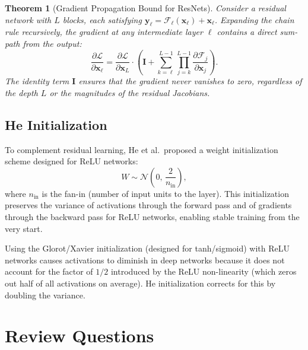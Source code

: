 \documentclass[12pt,a4paper]{article}
\newtheorem{theorem}{Theorem}[section]
\begin{document}
\begin{theorem}[Gradient Propagation Bound for ResNets]
\label{thm:resnet_grad}
Consider a residual network with $L$ blocks, each satisfying $\mathbf{y}_\ell = \mathcal{F}_\ell(\mathbf{x}_\ell) + \mathbf{x}_\ell$. Expanding the chain rule recursively, the gradient at any intermediate layer $\ell$ contains a direct sum-path from the output:
\begin{equation}
  \frac{\partial \mathcal{L}}{\partial \mathbf{x}_\ell}
  = \frac{\partial \mathcal{L}}{\partial \mathbf{x}_L}
    \cdot \left(\mathbf{I} + \sum_{k=\ell}^{L-1} \prod_{j=k}^{L-1}
      \frac{\partial \mathcal{F}_j}{\partial \mathbf{x}_j}\right).
  \label{eq:resnet_grad_bound}
\end{equation}
The identity term $\mathbf{I}$ ensures that the gradient never vanishes to zero, regardless of the depth $L$ or the magnitudes of the residual Jacobians.
\end{theorem}

\subsection{He Initialization}

To complement residual learning, He et al.\ proposed a weight initialization scheme designed for ReLU networks:
\begin{equation}
  W \sim \mathcal{N}\!\left(0,\, \frac{2}{n_{\text{in}}}\right),
  \label{eq:he_init}
\end{equation}
where $n_{\text{in}}$ is the fan-in (number of input units to the layer). This initialization preserves the variance of activations through the forward pass and of gradients through the backward pass for ReLU networks, enabling stable training from the very start.

\begin{warningbox}
Using the Glorot/Xavier initialization (designed for tanh/sigmoid) with ReLU networks causes activations to diminish in deep networks because it does not account for the factor of $1/2$ introduced by the ReLU non-linearity (which zeros out half of all activations on average). He initialization corrects for this by doubling the variance.
\end{warningbox}

\section{Review Questions}
\label{sec:review}
\end{document}
